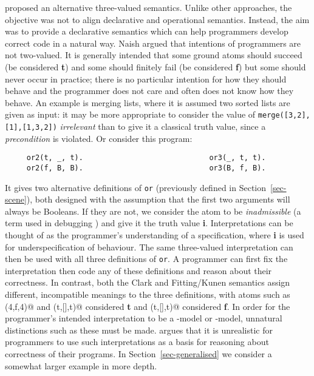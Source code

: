 \documentclass{tlp}
\begin{document}
 proposed an alternative three-valued semantics.
Unlike other approaches, the objective was not to align declarative and
operational semantics.  Instead, the aim was to provide a declarative
semantics which can help programmers develop correct code in a natural
way.  Naish argued that intentions of programmers are not two-valued.  It
is generally intended that some ground atoms should succeed (be considered
\textbf{t}) and some should finitely fail (be considered \textbf{f}) but
some should never occur in practice; there is no particular intention
for how they should behave and the programmer does not care and often
does not know how they behave. An example is merging lists, where it is
assumed two sorted lists are given as input: it may be more appropriate to
consider the value of \verb!merge([3,2],[1],[1,3,2])! \emph{irrelevant}
than to give it a classical truth value, since a \emph{precondition}
is violated.  Or consider this program:
\begin{verbatim}
     or2(t, _, t).                             or3(_, t, t).
     or2(f, B, B).                             or3(B, f, B).
\end{verbatim}
It gives two alternative definitions of \texttt{or} 
(previously defined in Section~\ref{sec-scene}), both designed with the 
assumption that the first two arguments will always be Booleans.
If they are not, we consider the atom to be \emph{inadmissible}
(a term used in debugging \cite{Per86,ddscheme3}) and give it
the truth value \textbf{i}.
Interpretations can be thought of as the programmer's understanding
of a specification, where \textbf{i} is used for underspecification
of behaviour.  The same three-valued interpretation can then be used with
all three definitions of \texttt{or}.  A programmer can first fix the
interpretation then code any of these definitions and reason about their
correctness.  In contrast, both the Clark and Fitting/Kunen semantics
assign different, incompatible
meanings to the three definitions, with atoms such
as (4,f,4)@ and (t,[],t)@ considered \textbf{t} and
(t,[],t)@ considered \textbf{f}.  In order for the programmer's
intended interpretation to be a -model or -model, unnatural
distinctions such as these must be made.   argues
that it is unrealistic for programmers to use such interpretations as 
a basis for reasoning about correctness of their programs.
In Section~\ref{sec-generalised} we consider a somewhat larger example
in more depth.
\end{document}
